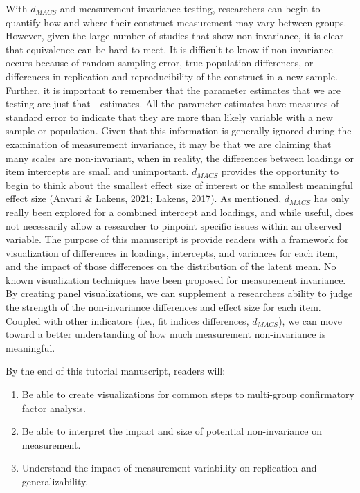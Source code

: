 \documentclass[
  man]{apa7}
\providecommand{\tightlist}{%
  \setlength{\itemsep}{0pt}\setlength{\parskip}{0pt}}
\begin{document}
With \(d_{MACS}\) and measurement invariance testing, researchers can begin to quantify how and where their construct measurement may vary between groups. However, given the large number of studies that show non-invariance, it is clear that equivalence can be hard to meet. It is difficult to know if non-invariance occurs because of random sampling error, true population differences, or differences in replication and reproducibility of the construct in a new sample. Further, it is important to remember that the parameter estimates that we are testing are just that - estimates. All the parameter estimates have measures of standard error to indicate that they are more than likely variable with a new sample or population. Given that this information is generally ignored during the examination of measurement invariance, it may be that we are claiming that many scales are non-invariant, when in reality, the differences between loadings or item intercepts are small and unimportant. \(d_{MACS}\) provides the opportunity to begin to think about the smallest effect size of interest or the smallest meaningful effect size (Anvari \& Lakens, 2021; Lakens, 2017). As mentioned, \(d_{MACS}\) has only really been explored for a combined intercept and loadings, and while useful, does not necessarily allow a researcher to pinpoint specific issues within an observed variable. The purpose of this manuscript is provide readers with a framework for visualization of differences in loadings, intercepts, and variances for each item, and the impact of those differences on the distribution of the latent mean. No known visualization techniques have been proposed for measurement invariance. By creating panel visualizations, we can supplement a researchers ability to judge the strength of the non-invariance differences and effect size for each item. Coupled with other indicators (i.e., fit indices differences, \(d_{MACS}\)), we can move toward a better understanding of how much measurement non-invariance is meaningful.

By the end of this tutorial manuscript, readers will:

\begin{enumerate}
\def\labelenumi{\arabic{enumi}.}
\tightlist
\item
  Be able to create visualizations for common steps to multi-group confirmatory factor analysis.
\item
  Be able to interpret the impact and size of potential non-invariance on measurement.
\item
  Understand the impact of measurement variability on replication and generalizability.
\end{enumerate}
\end{document}
